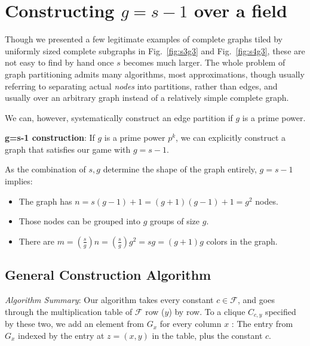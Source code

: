 \documentclass[11pt, oneside]{article} 	%
\begin{document}
\section{Constructing $g = s-1$ over a field}

Though we presented a few legitimate examples of complete graphs tiled by uniformly sized complete subgraphs in Fig.~\ref{fig:s3g3} and Fig.~\ref{fig:s4g3}, these are not easy to find by hand once $s$ becomes much larger. The whole problem of graph partitioning admits many algorithms, most approximations\cite{3}, though usually referring to separating actual \emph{nodes} into partitions, rather than edges, and usually over an arbitrary graph instead of a relatively simple complete graph.

We can, however, systematically construct an edge partition if $g$ is a prime power.

\begin{framed}
\textbf{g=s-1 construction}: If $g$ is a prime power $p^k$, we can explicitly construct a graph that satisfies our game with $g = s-1$.
\end{framed}


As the combination of $s, g$ determine the shape of the graph entirely, $g = s-1$ implies:
\begin{itemize}
\item The graph has $n = s(g-1) + 1 = (g+1)(g-1) + 1 = g^2$ nodes.
\item Those nodes can be grouped into $g$ groups of size $g$.
\item There are $m = (\frac{s}{g}) n = (\frac{s}{g}) g ^2 = sg = (g+1)g$ colors in the graph.
\end{itemize}

\subsection{General Construction Algorithm}
\emph{Algorithm Summary}: Our algorithm takes every constant $c \in \mathcal{F}$, and goes through the multiplication table of $\mathcal{F}$ row ($y$) by row.  To a clique $C_{c,y}$ specified by these two,  we add an element from $G_x$ for every column $x$ : The entry from $G_x$ indexed by the entry at $z = (x,y)$ in the table, plus the constant $c$.
\end{document}
